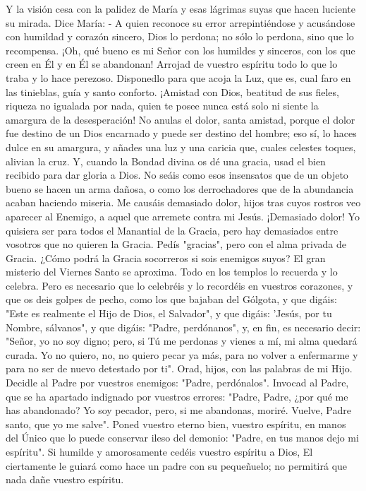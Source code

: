 \documentclass[12pt]{book} %
\begin{document}
Y la visión cesa con la palidez de María y esas lágrimas suyas que hacen luciente su mirada. 
Dice María:                            
- A quien reconoce su error arrepintiéndose y acusándose con humildad y corazón sincero, Dios lo perdona; no sólo lo perdona, sino que lo recompensa. ¡Oh, qué bueno es mi Señor con los humildes y sinceros, con los que creen en Él y en Él se abandonan! 
Arrojad de vuestro espíritu todo lo que lo traba y lo hace perezoso. Disponedlo para que acoja la Luz, que es, cual faro 
en las tinieblas, guía y santo conforto. 
¡Amistad con Dios, beatitud de sus fieles, riqueza no igualada por nada, quien te posee nunca está solo ni siente la 
amargura de la desesperación! No anulas el dolor, santa amistad, porque el dolor fue destino de un Dios encarnado y puede ser destino del hombre; eso sí, lo haces dulce en su amargura, y añades una luz y una caricia que, cuales celestes toques, alivian la cruz. 
Y, cuando la Bondad divina os dé una gracia, usad el bien recibido para dar gloria a Dios. No seáis como esos insensatos que de un objeto bueno se hacen un arma dañosa, o como los derrochadores que de la abundancia acaban haciendo miseria. 
Me causáis demasiado dolor, hijos tras cuyos rostros veo aparecer al Enemigo, a aquel que arremete contra mi Jesús. ¡Demasiado dolor! Yo quisiera ser para todos el Manantial de la Gracia, pero hay demasiados entre vosotros que no quieren la Gracia. Pedís "gracias", pero con el alma privada de Gracia. ¿Cómo podrá la Gracia socorreros si sois enemigos suyos? 
El gran misterio del Viernes Santo se aproxima. Todo en los templos lo recuerda y lo celebra. Pero es necesario que lo 
celebréis y lo recordéis en vuestros corazones, y que os deis golpes de pecho, como los que bajaban del Gólgota, y que digáis: "Este es realmente el Hijo de Dios, el Salvador", y que digáis: 'Jesús, por tu Nombre, sálvanos", y que digáis: "Padre, perdónanos", y, en fin, es necesario decir: "Señor, yo no soy digno; pero, si Tú me perdonas y vienes a mí, mi alma quedará curada. Yo no quiero, no, no quiero pecar ya más, para no volver a enfermarme y para no ser de nuevo detestado por ti". 
Orad, hijos, con las palabras de mi Hijo. Decidle al Padre por vuestros enemigos: "Padre, perdónalos". Invocad al Padre, que se ha apartado indignado por vuestros errores: "Padre, Padre, ¿por qué me has abandonado? Yo soy pecador, pero, si me abandonas, moriré. Vuelve, Padre santo, que yo me salve". Poned vuestro eterno bien, vuestro espíritu, en manos del Único que lo puede conservar ileso del demonio: "Padre, en tus manos dejo mi espíritu". Si humilde y amorosamente cedéis vuestro espíritu a Dios, El ciertamente le guiará como hace un padre con su pequeñuelo; no permitirá que nada dañe vuestro espíritu. 
\end{document}
